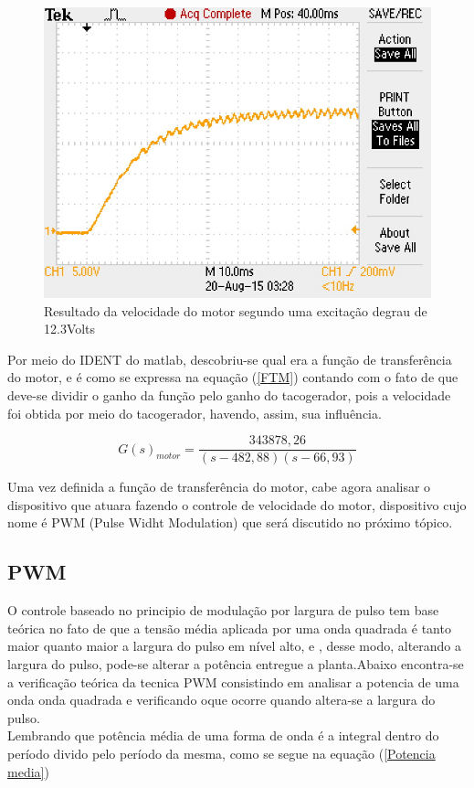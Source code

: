 \documentclass[11pt, a4paper, oneside]{article}
\begin{document}
\begin{figure}[h!]
\centering
\includegraphics[width=.7\linewidth]{motor_osciloscopio.jpg}
\caption{Resultado da velocidade do motor segundo uma excitação degrau de 12.3Volts}
\label{Extracao de dados osciloscopio motor 2}
\end{figure}

Por meio do IDENT do matlab, descobriu-se qual era a função de transferência do motor, e é como se expressa na equação (\ref{FTM}) contando com o fato de que deve-se dividir o ganho da função pelo ganho do tacogerador, pois a velocidade foi obtida por meio do tacogerador, havendo, assim, sua influência.

\begin{equation}
\label{FTM}
G(s)_{motor}=\frac{343878,26}{(s-482,88)(s-66,93)}
\end{equation}

Uma vez definida a função de transferência do motor, cabe agora analisar o dispositivo que atuara fazendo o controle de velocidade do motor, dispositivo cujo nome é PWM (Pulse Widht Modulation) que será discutido no próximo tópico.

\subsection{PWM}

O controle baseado no principio de modulação por largura de pulso tem base teórica no fato de que a tensão média aplicada por uma onda quadrada é tanto maior quanto maior a largura do pulso em nível alto, e , desse modo, alterando a largura do pulso, pode-se alterar a potência entregue a planta.Abaixo encontra-se a verificação teórica da tecnica PWM consistindo em analisar a potencia de uma onda onda quadrada e verificando oque ocorre quando altera-se a largura do pulso.
\\
Lembrando que potência média de uma forma de onda é a integral dentro do período divido pelo período da mesma, como se segue na equação (\ref{Potencia media})
\end{document}
